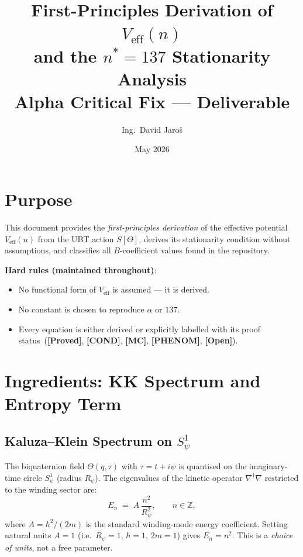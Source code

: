 \documentclass[12pt,a4paper]{article}
\title{\textbf{First-Principles Derivation of $V_{\mathrm{eff}}(n)$\\
         and the $n^* = 137$ Stationarity Analysis}\\
         \large Alpha Critical Fix — Deliverable}
\author{Ing.\ David Jaro\v{s}}
\date{May 2026}
\theoremstyle{definition}
\theoremstyle{remark}
\newcommand{\ZZ}{\mathbb{Z}}
\newcommand{\PROVED}{\textbf{[Proved]}}
\newcommand{\OPEN}{\textbf{[Open]}}
\newcommand{\COND}{\textbf{[COND]}}
\newcommand{\MC}{\textbf{[MC]}}
\newcommand{\PHENOM}{\textbf{[PHENOM]}}
\begin{document}
  \maketitle
  \tableofcontents
  \newpage
\fi

\section{Purpose}
\label{sec:vc2:purpose}

This document provides the \emph{first-principles derivation} of the effective
potential $V_{\mathrm{eff}}(n)$ from the UBT action $S[\Theta]$, derives its
stationarity condition without assumptions, and classifies all $B$-coefficient
values found in the repository.

\begin{warnbox}
\textbf{Hard rules (maintained throughout)}:
\begin{itemize}
  \item No functional form of $V_{\mathrm{eff}}$ is assumed — it is derived.
  \item No constant is chosen to reproduce $\alpha$ or $137$.
  \item Every equation is either derived or explicitly labelled with its
        proof status~(\PROVED, \COND, \MC, \PHENOM, \OPEN).
\end{itemize}
\end{warnbox}

\section{Ingredients: KK Spectrum and Entropy Term}
\label{sec:vc2:ingredients}

\subsection{Kaluza–Klein Spectrum on $S^1_\psi$}
\label{sec:vc2:KK}

The biquaternion field $\Theta(q,\tau)$ with $\tau = t + i\psi$ is quantised on
the imaginary-time circle $S^1_\psi$ (radius $R_\psi$).
The eigenvalues of the kinetic operator $\nabla^\dagger\nabla$ restricted to the
winding sector are:
\begin{equation}
  E_n \;=\; A\,\frac{n^2}{R_\psi^2},
  \qquad n \in \ZZ,
  \label{eq:vc2:KK}
\end{equation}
where $A = \hbar^2/(2m)$ is the standard winding-mode energy coefficient.
Setting natural units $A = 1$ (i.e.\ $R_\psi = 1$, $\hbar = 1$, $2m = 1$)
gives $E_n = n^2$. This is a \emph{choice of units}, not a free parameter.
\end{document}
